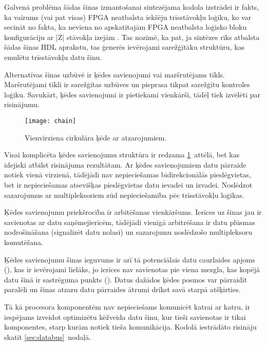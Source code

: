 	Galvenā problēma šādas šinas izmantošanai sintezējama kodola izstrādei ir
	fakts, ka vairums (vai pat visas) FPGA neatbalsta iekšēju trīsstāvokļu
	loģiku, ko var secināt no fakta, ka neviena no apskatītajām FPGA neatbalsta
	loģisko bloku konfigurāciju ar |Z| stāvokļa izejām
	\cite[18.~lpp.]{FusionFAQ}\cite{SmartFusionFabric}\cite{Xilinx7}.
	Tas nozīmē, ka pat, ja sintēzes rīks atbalsta šādas šinas HDL aprakstu, tas
	ģenerēs ievērojami sarežģītāku struktūru, kas emulētu trīsstāvokļu datu šinu.

	Alternatīvas šinas uzbūvē ir ķēdes savienojumi vai maršrutējams tīkls.
	Maršrutējami tīkli ir sarežģītas uzbūves un pieprasa tikpat sarežģītu
	kontroles loģiku. Savukārt, ķēdes savienojumi ir pietiekami vienkārši,
	tādēļ tiek izvēlēti par risinājumu.

	\begin{figure}[thb]
		\centering
		\texttt{[image: chain]}
		\caption{Vienvirziena cirkulāra ķēde ar atzarojumiem.}
		\label{fig:chain}
	\end{figure}

	Visai komplicēta ķēdes savienojumu struktūra ir redzama \ref{fig:chain}~attēlā,
	bet kas idejiski atbilst risinājuma rezultātam. 
	Ar ķēdes savienojumiem datu pārraide notiek vienā virzienā,
	tādējādi nav nepieciešamas bidirekcionālās pieslēgvietas, bet ir nepieciešamas
	atsevišķas pieslēgvietas datu ievadei un izvadei. Noslēdzot sazarojumus ar
	multipleksoriem zūd nepieciešamība pēc trīsstāvokļu loģikas.

	Ķēdes savienojumu priekšrocība ir arbitēšanas vienkāršums. Ierīces uz šinas
	jau ir savienotas ar datu saņēmejierīcēm, tādējādi vienīgā arbitrēšana ir
	datu plūsmas nodrošināšana (signalizēt datu nolasi) un sazarojumu noslēdzošo
	multipleksoru komutēšana.
	
	Ķēdes savienojumu šinas ieguvums ir arī tā potenciālais datu caurlaides
	apjoms (), kas ir ievērojami lielāks, jo ierīces nav
	savienotas pie viena mezgla, kas kopējā datu šinā ir sastrēguma punkts
	(). Datus dažādos ķēdes posmos var pārraidīt
	paralēli un šinas atzaru datu pārraides ātrumi drīkst savā starpā 
	atšķirties.

	Tā kā procesora komponentēm nav nepieciešams komunicēt katrai ar katru, ir
	iespējams izveidot optimizētu kēžveida datu šinu, kur tieši savienotas ir tikai
	komponentes, starp kurām notiek tieša komunikācija. Kodolā iestrādāto
	risināju skatīt \ref{sec:databus}~nodaļā.

\pagebreak[3]
